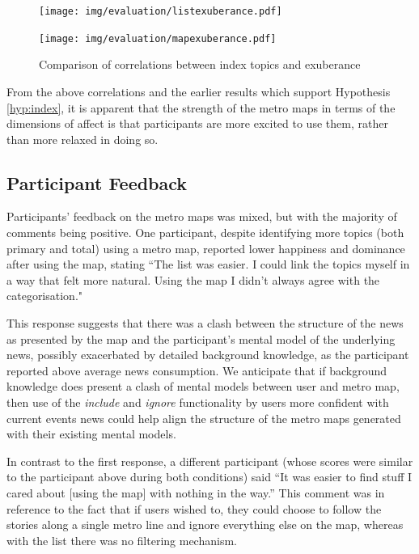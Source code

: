 \begin{figure}[htbp!]
\centering
\begin{minipage}{.5\textwidth}
  \centering
  \texttt{[image: img/evaluation/listexuberance.pdf]}
  \end{minipage}%
\begin{minipage}{.5\textwidth}
  \centering
  \texttt{[image: img/evaluation/mapexuberance.pdf]}
\end{minipage}
	\caption{Comparison of correlations between index topics and exuberance}
  \label{fig:exuberance}
\end{figure}

From the above correlations and the earlier results which support Hypothesis \ref{hyp:index}, it is apparent that the strength of the metro maps in terms of the dimensions of affect is that participants are more excited to use them, rather than more relaxed in doing so.


\subsection{Participant Feedback}

Participants' feedback on the metro maps was mixed, but with the majority of comments being positive. One participant, despite identifying more topics (both primary and total) using a metro map, reported lower happiness and dominance after using the map, stating ``The list was easier. I could link the topics myself in a way that felt more natural. Using the map I didn't always agree with the categorisation." 

This response suggests that there was a clash between the structure of the news as presented by the map and the participant's mental model of the underlying news, possibly exacerbated by detailed background knowledge, as the participant reported above average news consumption. We anticipate that if background knowledge does present a clash of mental models between user and metro map, then use of the \textit{include} and \textit{ignore} functionality by users more confident with current events news could help align the structure of the metro maps generated with their existing mental models. 

In contrast to the first response, a different participant (whose scores were similar to the participant above during both conditions) said ``It was easier to find stuff I cared about [using the map] with nothing in the way.'' This comment was in reference to the fact that if users wished to, they could choose to follow the stories along a single metro line and ignore everything else on the map, whereas with the list there was no filtering mechanism.

